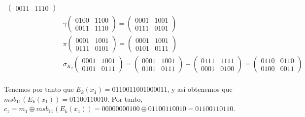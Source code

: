 \documentclass[fleqn]{article}
\begin{document}
\begin{equation*}
\begin{aligned}
\begin{pmatrix}
                0011 & 1110
            \end{pmatrix} \\
            &\gamma \begin{pmatrix}
                0100 & 1100 \\
                0011 & 1110
            \end{pmatrix} =
            \begin{pmatrix}
                0001 & 1001 \\
                0111 & 0101
            \end{pmatrix} \\
            &\pi \begin{pmatrix}
                0001 & 1001 \\
                0111 & 0101
            \end{pmatrix} =
            \begin{pmatrix}
                0001 & 1001 \\
                0101 & 0111
            \end{pmatrix} \\
            &\sigma_{K_2} \begin{pmatrix}
                0001 & 1001 \\
                0101 & 0111
            \end{pmatrix} =
            \begin{pmatrix}
                0001 & 1001 \\
                0101 & 0111
            \end{pmatrix} +
            \begin{pmatrix}
                0111 & 1111 \\
                0001 & 0100
            \end{pmatrix} =
            \begin{pmatrix}
                0110 & 0110 \\
                0100 & 0011
            \end{pmatrix} \\
        \end{aligned}
    \end{equation*}

    Tenemos por tanto que $E_k(x_1) = 0110011001000011$, y así obtenemos que $msb_{11}(E_k(x_1)) = 01100110010$. Por tanto, 
    $c_1 = m_1 \oplus msb_{11}(E_k(x_1)) = 00000000100 \oplus 01100110010 = 01100110110$.
\end{document}
